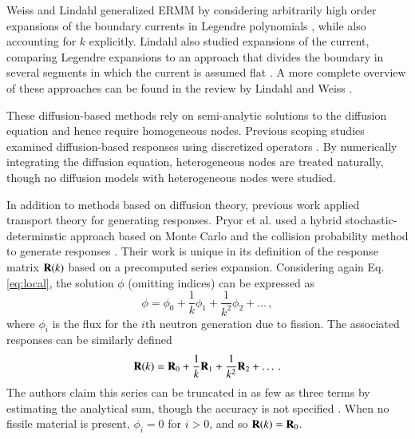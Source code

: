 Weiss and Lindahl generalized ERMM by considering arbitrarily 
high order expansions of the boundary currents in Legendre 
polynomials \cite{weiss1975hor}, while also accounting for $k$ explicitly.
Lindahl also studied expansions of the current, comparing Legendre 
expansions to an approach that divides the boundary in several segments 
in which the current is assumed flat \cite{lindahl1976mdr}.  A more
complete overview of these approaches can be found in the review by Lindahl
and Weiss \cite{lindahl1981rrm}.

These diffusion-based methods rely on semi-analytic solutions to the 
diffusion equation and hence require homogeneous nodes. Previous 
scoping studies examined diffusion-based responses using discretized 
operators \cite{roberts2011ser}.  By numerically integrating the diffusion 
equation, heterogeneous nodes are treated naturally, though no diffusion 
models with heterogeneous nodes were studied.


In addition to methods based on diffusion theory, previous work applied 
transport theory for generating responses. Pryor et al. used 
a hybrid stochastic-determinstic approach based on
Monte Carlo and the collision probability 
method to generate responses \cite{pryor1973rmm, pryor1975rdr,
sicilian1975atr}.  Their work is unique in its definition
of the response matrix $\mathbf{R}(k)$ based on a precomputed 
series expansion.  Considering again Eq. \ref{eq:local}, the 
solution $\phi$ (omitting 
indices) can
be expressed as
\begin{equation}
 \phi = \phi_{0} + \frac{1}{k}\phi_{1}
                 + \frac{1}{k^2}\phi_{2}  + \ldots \, ,
\end{equation}
where $\phi_{i} $ is the flux for the $i$th neutron
generation due to fission.  The 
associated responses can be similarly defined
\begin{equation}
 \mathbf{R}(k) = \mathbf{R}_0 + \frac{1}{k}\mathbf{R}_1
                 + \frac{1}{k^2}\mathbf{R}_2  + \ldots \, .
\label{eq:responsesum}
\end{equation}
The authors claim this series can be truncated in as few as three terms 
by estimating the analytical sum, though the accuracy is not 
specified \cite{sicilian1975atr}.  When no fissile material is present, 
$\phi_{i} = 0$ for $i > 0$, and so $\mathbf{R}(k) = \mathbf{R}_0$.


